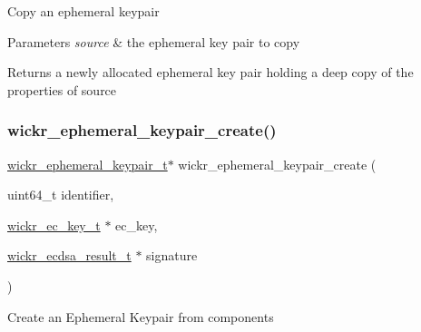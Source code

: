 Copy an ephemeral keypair


\begin{DoxyParams}{Parameters}
{\em source} & the ephemeral key pair to copy \\
\hline
\end{DoxyParams}
\begin{DoxyReturn}{Returns}
a newly allocated ephemeral key pair holding a deep copy of the properties of \textquotesingle{}source\textquotesingle{} 
\end{DoxyReturn}
\mbox{\label{group__wickr__ephemeral__keypair_gab956214203938b4b02b8f30666eaec3b}} 
\subsubsection{\texorpdfstring{wickr\+\_\+ephemeral\+\_\+keypair\+\_\+create()}{wickr\_ephemeral\_keypair\_create()}}
{\footnotesize\ttfamily \mbox{\hyperlink{structwickr__ephemeral__keypair}{wickr\+\_\+ephemeral\+\_\+keypair\+\_\+t}}$\ast$ wickr\+\_\+ephemeral\+\_\+keypair\+\_\+create (\begin{DoxyParamCaption}\item[{uint64\+\_\+t}]{identifier,  }\item[{\mbox{\hyperlink{structwickr__ec__key}{wickr\+\_\+ec\+\_\+key\+\_\+t}} $\ast$}]{ec\+\_\+key,  }\item[{\mbox{\hyperlink{structwickr__ecdsa__result}{wickr\+\_\+ecdsa\+\_\+result\+\_\+t}} $\ast$}]{signature }\end{DoxyParamCaption})}

Create an Ephemeral Keypair from components



